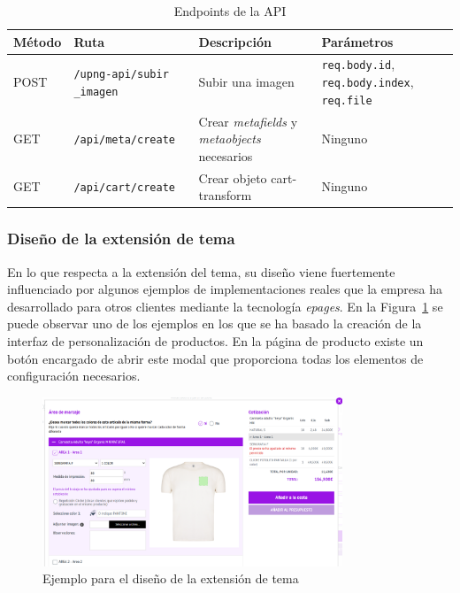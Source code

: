 \documentclass[11pt]{article}
\begin{document}
\begin{table}[h!]
    \centering
    \begin{tabularx}{\textwidth}{|X|X|X|X|}
        \hline
        \textbf{Método} & \textbf{Ruta} & \textbf{Descripción} & \textbf{Parámetros} \\
        \hline
        POST & \texttt{/upng-api/subir
        \_imagen} & Subir una imagen & 
        \texttt{req.body.id}, \texttt{req.body.index}, \texttt{req.file} \\
        \hline
        GET & \texttt{/api/meta/create} & Crear \textit{metafields} y \textit{metaobjects} necesarios & Ninguno \\
        \hline
        GET & \texttt{/api/cart/create} & Crear objeto 
        cart-transform & Ninguno \\
        \hline
    \end{tabularx}
    \caption{Endpoints de la API}
    \label{tab:endpoints}
\end{table}

\subsubsection{Diseño de la extensión de tema}
En lo que respecta a la extensión del tema, su diseño viene fuertemente influenciado por algunos ejemplos de implementaciones reales que la empresa ha desarrollado para otros clientes 
mediante la tecnología \textit{epages}. En la Figura~\ref{fig:disenoExtension} se puede observar uno de los ejemplos en los que se ha basado la creación de la interfaz
de personalización de productos. En la página de producto existe un botón encargado de abrir este modal que proporciona todas los elementos de configuración necesarios.

\begin{figure}[H]
    \centering
    \includegraphics[width=0.8\textwidth]{imagenes-diseño/diseñoPersonalizador.png}
    \caption{\label{fig:disenoExtension}Ejemplo para el diseño de la extensión de tema}
    \vspace{\fill}
\end{figure}
\end{document}
